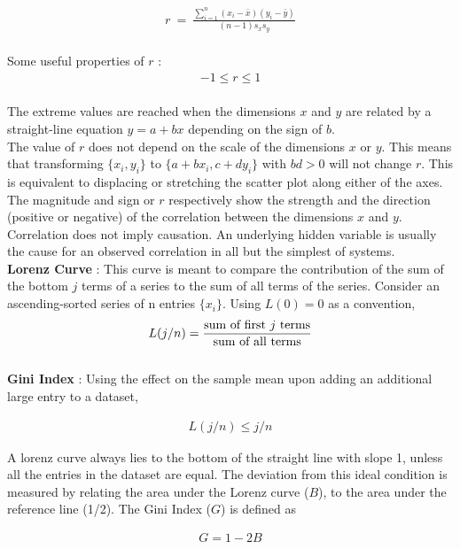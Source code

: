 \begin{align}
	r \ =\ \frac{\sum\limits_{i = 1}^{n} (x_i - \bar{x}) (y_i - \bar{y})}{(n - 1) s_x s_y}
\end{align} \\

Some useful properties of $ r $ : 
\begin{align}
	-1 \leq r \leq 1
\end{align}\\
 
The extreme values are reached when the dimensions $ x $ and $ y $ are related by a straight-line equation $ y = a + bx $ depending on the sign of $ b $. \\

The value of $ r $ does not depend on the scale of the dimensions $ x $ or $ y $. This means that transforming $ \{x_i , y_i\} $ to $ \{a + b x_i , c + d y_i\} $ with $ bd > 0 $ will not change $ r $. This is equivalent to displacing or stretching the scatter plot along either of the axes. \\

The magnitude and sign or $ r $ respectively show the strength and the direction (positive or negative) of the correlation between the dimensions $ x $ and $ y $. Correlation does not imply causation. An underlying hidden variable is usually the cause for an observed correlation in all but the simplest of systems. \\

\textbf{Lorenz Curve} : This curve is meant to compare the contribution of the sum of the bottom $ j $ terms of a series to the sum of all terms of the series. Consider an ascending-sorted series of n entries $ \{x_i\} $. Using $ L(0) = 0 $ as a convention,  \\

\begin{align}
	L(j/n) = \frac{\text{sum of first $ j $ terms}}{\text{sum of all terms}}
\end{align} \\

\textbf{Gini Index} : Using the effect on the sample mean upon adding an additional large entry to a dataset, 

\begin{align}
	L(j/n) \leq j / n
\end{align}

A lorenz curve always lies to the bottom of the straight line with slope 1, unless all the entries in the dataset are equal. The deviation from this ideal condition is measured by relating the area under the Lorenz curve ($ B $), to the area under the reference line (1/2). The Gini Index ($ G $) is defined as

 \begin{align}
 	G = 1 - 2B
 \end{align}

\newpage

